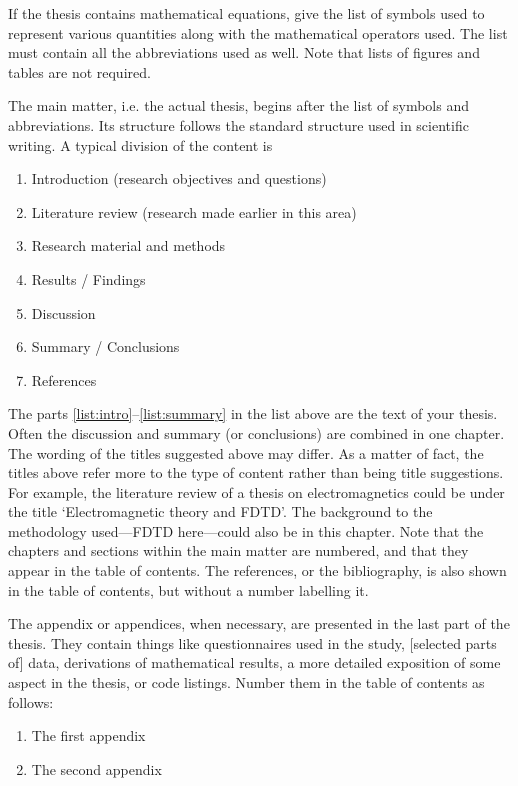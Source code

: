 \documentclass[english, 12pt, a4paper, biz, utf8, a-2b, online]{aaltothesis}
\begin{document}
If the thesis contains mathematical equations, give the list of symbols used to 
represent various quantities along with the mathematical operators used.
The list must contain all the abbreviations used as well. Note that lists of
figures and tables are not required.

The main matter, i.e. the actual thesis, begins after the list of symbols and 
abbreviations. Its structure follows the standard structure used in scientific 
writing. A typical division of the content is
\begin{enumerate}
	\item \label{list:intro} Introduction (research objectives and questions)
	\item Literature review (research made earlier in this area)
	\item Research material and methods
	\item Results / Findings
	\item Discussion
	\item \label{list:summary} Summary / Conclusions
	\item References
\end{enumerate}
The parts \ref{list:intro}--\ref{list:summary} in the list above are the text  
of your thesis. Often the discussion and summary (or conclusions) are combined 
in one chapter. The wording of the titles suggested above may differ. As a 
matter of fact, the titles above refer more to the type of content rather than 
being title suggestions. For example, the literature review of a thesis on 
electromagnetics could be under the title ‘Electromagnetic theory and FDTD’. 
The background to the methodology used---FDTD here---could also be in this 
chapter. Note that the chapters and sections within the main matter are 
numbered, and that they appear in the table of contents. The references, or the 
bibliography, is also shown in the table of contents, but without a number 
labelling it.

The appendix or appendices, when necessary, are presented in the last part of
the thesis. They contain things like questionnaires used in the study, 
[selected parts of] data, derivations of mathematical results, a more detailed 
exposition of some aspect in the thesis, or code listings. Number them in the 
table of contents as follows:
\begin{enumerate}
\renewcommand{\labelenumi}{\Alph{enumi}.}
	\item The first appendix
	\item The second appendix
\end{enumerate}
\end{document}
